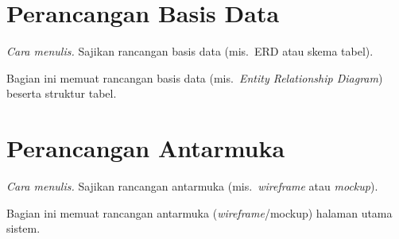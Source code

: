 \section{Perancangan Basis Data}
\emph{Cara menulis.} Sajikan rancangan basis data (mis.\ ERD atau skema tabel).

Bagian ini memuat rancangan basis data (mis.\ \emph{Entity Relationship Diagram})
beserta struktur tabel.

\section{Perancangan Antarmuka}
\emph{Cara menulis.} Sajikan rancangan antarmuka (mis.\ \emph{wireframe} atau \emph{mockup}).

Bagian ini memuat rancangan antarmuka (\emph{wireframe}/mockup) halaman utama
sistem.
